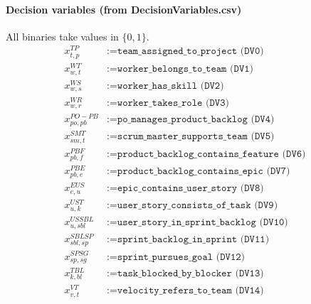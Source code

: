 \documentclass[11pt,a4paper]{article}
\begin{document}
\paragraph{Decision variables (from DecisionVariables.csv)}
All binaries take values in $\{0,1\}$.
\begin{align*}
x^{TP}_{t,p} &:= \texttt{team\_assigned\_to\_project (DV0)} \\
x^{WT}_{w,t} &:= \texttt{worker\_belongs\_to\_team (DV1)} \\
x^{WS}_{w,s} &:= \texttt{worker\_has\_skill (DV2)} \\
x^{WR}_{w,r} &:= \texttt{worker\_takes\_role (DV3)} \\
x^{PO\!-\!PB}_{po,pb} &:= \texttt{po\_manages\_product\_backlog (DV4)} \\
x^{SMT}_{sm,t} &:= \texttt{scrum\_master\_supports\_team (DV5)} \\
x^{PB\!F}_{pb,f} &:= \texttt{product\_backlog\_contains\_feature (DV6)} \\
x^{PB\!E}_{pb,e} &:= \texttt{product\_backlog\_contains\_epic (DV7)} \\
x^{E\!US}_{e,u} &:= \texttt{epic\_contains\_user\_story (DV8)} \\
x^{US\!T}_{u,k} &:= \texttt{user\_story\_consists\_of\_task (DV9)} \\
x^{US\!SBL}_{u,sbl} &:= \texttt{user\_story\_in\_sprint\_backlog (DV10)} \\
x^{SBL\!SP}_{sbl,sp} &:= \texttt{sprint\_backlog\_in\_sprint (DV11)} \\
x^{SP\!SG}_{sp,sg} &:= \texttt{sprint\_pursues\_goal (DV12)} \\
x^{T\!BL}_{k,bl} &:= \texttt{task\_blocked\_by\_blocker (DV13)} \\
x^{V\!T}_{v,t} &:= \texttt{velocity\_refers\_to\_team (DV14)}
\end{align*}
\end{document}
